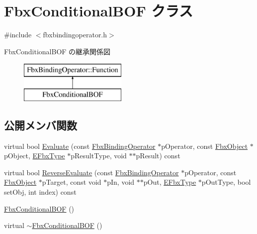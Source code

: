 \hypertarget{class_fbx_conditional_b_o_f}{}\section{Fbx\+Conditional\+B\+OF クラス}
\label{class_fbx_conditional_b_o_f}


{\ttfamily \#include $<$fbxbindingoperator.\+h$>$}

Fbx\+Conditional\+B\+OF の継承関係図\begin{figure}[H]
\begin{center}
\leavevmode
\includegraphics[height=2.000000cm]{class_fbx_conditional_b_o_f}
\end{center}
\end{figure}
\subsection*{公開メンバ関数}
\begin{DoxyCompactItemize}
\item 
virtual bool \hyperlink{class_fbx_conditional_b_o_f_ac01ad643a1505219964c8b379385e931}{Evaluate} (const \hyperlink{class_fbx_binding_operator}{Fbx\+Binding\+Operator} $\ast$p\+Operator, const \hyperlink{class_fbx_object}{Fbx\+Object} $\ast$p\+Object, \hyperlink{fbxpropertytypes_8h_a73913a5ddfb20e57c6f25e9e6784bd92}{E\+Fbx\+Type} $\ast$p\+Result\+Type, void $\ast$$\ast$p\+Result) const
\item 
virtual bool \hyperlink{class_fbx_conditional_b_o_f_a2d20cc9f6b6e1c5a469c49a55c8ed512}{Reverse\+Evaluate} (const \hyperlink{class_fbx_binding_operator}{Fbx\+Binding\+Operator} $\ast$p\+Operator, const \hyperlink{class_fbx_object}{Fbx\+Object} $\ast$p\+Target, const void $\ast$p\+In, void $\ast$$\ast$p\+Out, \hyperlink{fbxpropertytypes_8h_a73913a5ddfb20e57c6f25e9e6784bd92}{E\+Fbx\+Type} $\ast$p\+Out\+Type, bool set\+Obj, int index) const
\item 
\hyperlink{class_fbx_conditional_b_o_f_ab01caa5b426f06735e3729f9c59ff58e}{Fbx\+Conditional\+B\+OF} ()
\item 
virtual \hyperlink{class_fbx_conditional_b_o_f_aa4c2e32bdf6550a9c1f36c1f0490bb3a}{$\sim$\+Fbx\+Conditional\+B\+OF} ()
\end{DoxyCompactItemize}

